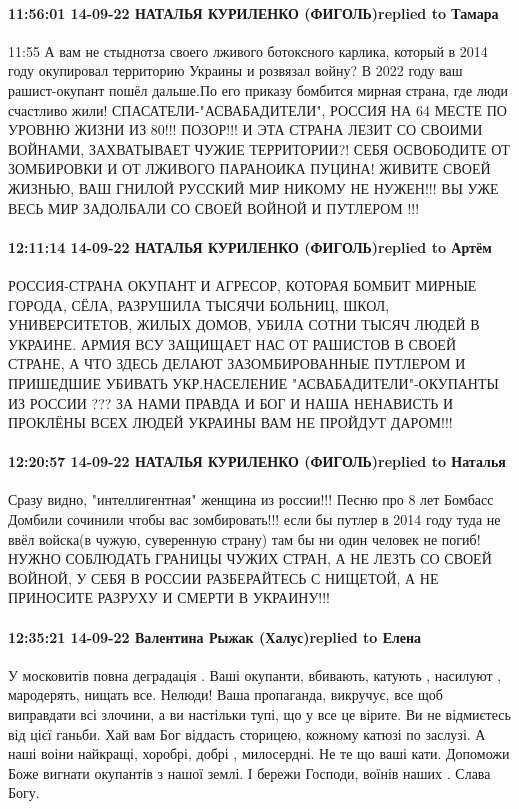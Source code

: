 \paragraph{11:56:01 14-09-22 НАТАЛЬЯ КУРИЛЕНКО (ФИГОЛЬ)replied to Тамара}
11:55
А вам не стыднотза своего лживого ботоксного карлика, который в 2014 году окупировал территорию Украины и розвязал войну?
В 2022 году ваш рашист-окупант пошёл дальше.По его приказу бомбится мирная страна, где люди счастливо жили!
СПАСАТЕЛИ-"АСВАБАДИТЕЛИ", РОССИЯ НА 64 МЕСТЕ ПО УРОВНЮ ЖИЗНИ ИЗ 80!!! ПОЗОР!!!
И ЭТА СТРАНА ЛЕЗИТ СО СВОИМИ ВОЙНАМИ, ЗАХВАТЫВАЕТ ЧУЖИЕ ТЕРРИТОРИИ?!
СЕБЯ ОСВОБОДИТЕ ОТ ЗОМБИРОВКИ И ОТ ЛЖИВОГО ПАРАНОИКА ПУЦИНА!
ЖИВИТЕ СВОЕЙ ЖИЗНЬЮ, ВАШ ГНИЛОЙ РУССКИЙ МИР НИКОМУ НЕ НУЖЕН!!! ВЫ УЖЕ ВЕСЬ МИР ЗАДОЛБАЛИ СО СВОЕЙ ВОЙНОЙ И ПУТЛЕРОМ !!!

\paragraph{12:11:14 14-09-22 НАТАЛЬЯ КУРИЛЕНКО (ФИГОЛЬ)replied to Артём}

РОССИЯ-СТРАНА ОКУПАНТ И АГРЕСОР, КОТОРАЯ БОМБИТ МИРНЫЕ ГОРОДА, СЁЛА, РАЗРУШИЛА ТЫСЯЧИ БОЛЬНИЦ, ШКОЛ, УНИВЕРСИТЕТОВ, ЖИЛЫХ ДОМОВ, УБИЛА СОТНИ ТЫСЯЧ ЛЮДЕЙ В УКРАИНЕ.
АРМИЯ ВСУ ЗАЩИЩАЕТ НАС ОТ РАШИСТОВ В СВОЕЙ СТРАНЕ, А ЧТО ЗДЕСЬ ДЕЛАЮТ ЗАЗОМБИРОВАННЫЕ ПУТЛЕРОМ И ПРИШЕДШИЕ УБИВАТЬ УКР.НАСЕЛЕНИЕ "АСВАБАДИТЕЛИ"-ОКУПАНТЫ ИЗ РОССИИ ???
ЗА НАМИ ПРАВДА И БОГ И НАША НЕНАВИСТЬ И ПРОКЛЁНЫ ВСЕХ ЛЮДЕЙ УКРАИНЫ ВАМ НЕ ПРОЙДУТ ДАРОМ!!!

\paragraph{12:20:57 14-09-22 НАТАЛЬЯ КУРИЛЕНКО (ФИГОЛЬ)replied to Наталья}

Сразу видно, "интеллигентная" женщина из россии!!!
Песню про 8 лет Бомбасс Домбили сочинили чтобы вас зомбировать!!! если бы путлер в 2014 году туда не ввёл войска(в чужую, суверенную страну) там бы ни один человек не погиб!
НУЖНО СОБЛЮДАТЬ ГРАНИЦЫ ЧУЖИХ СТРАН, А НЕ ЛЕЗТЬ СО СВОЕЙ ВОЙНОЙ, У СЕБЯ В РОССИИ РАЗБЕРАЙТЕСЬ С НИЩЕТОЙ, А НЕ ПРИНОСИТЕ РАЗРУХУ И СМЕРТИ В УКРАИНУ!!!

\paragraph{12:35:21 14-09-22 Валентина Рыжак (Халус)replied to Елена}

У московитів повна деградація . Ваші окупанти, вбивають, катують , насилуют ,
мародерять, нищать все. Нелюди! Ваша пропаганда, викручує, все щоб виправдати
всі злочини, а ви настільки тупі, що у все це вірите. Ви не відмиєтесь від цієї
ганьби. Хай вам Бог віддасть сторицею, кожному катюзі по заслузі. А наші воіни
найкращі, хоробрі, добрі , милосердні. Не те що ваші кати. Допоможи Боже
вигнати окупантів з нашої землі. І бережи Господи, воїнів наших . Слава Богу.


